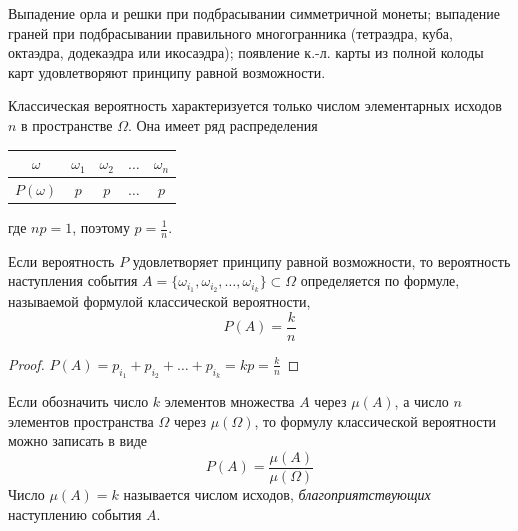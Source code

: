 Выпадение орла и решки при подбрасывании симметричной монеты; выпадение граней при подбрасывании правильного многогранника (тетраэдра, куба, октаэдра, додекаэдра или икосаэдра); появление к.-л. карты из полной
колоды карт удовлетворяют принципу равной возможности.

Классическая вероятность характеризуется только числом элементарных исходов $n$ в пространстве $\Omega$. Она имеет ряд распределения

\begin{center}
	\begin{tabular}{|c|c|c|c|c|}
		\hline
		$\omega$ & $\omega_1$ & $\omega_2$ & $\ldots$ & $\omega_n$ \\ \hline
		$P(\omega)$  & $p$ & $p$ & $\ldots$  & $p$ \\ \hline
	\end{tabular}
\end{center}

где $np = 1$, поэтому $p = \frac{1}{n}$.


\begin{lemma}
Если вероятность $P$ удовлетворяет принципу равной возможности, то вероятность наступления события $A = \{ \omega_{i_1} , \omega_{i_2} , \ldots , \omega_{i_k} \} \subset \Omega$ определяется по формуле, называемой формулой классической вероятности,
$$P(A) = \frac{k}{n}$$
\end{lemma} 
\begin{proof}
	$P(A) = p_{i_1} + p_{i_2} + \ldots + p_{i_k} = kp = \frac{k}{n}$
\end{proof}

Если обозначить число $k$ элементов множества $A$ через $\mu(A)$, а число $n$ элементов пространства $\Omega$ через $\mu(\Omega)$, то формулу классической вероятности
можно записать в виде
$$P(A) = \frac{\mu(A)}{\mu(\Omega)}$$
Число $\mu(A) = k$ называется числом исходов, \textit{благоприятствующих} наступлению события $A$.

